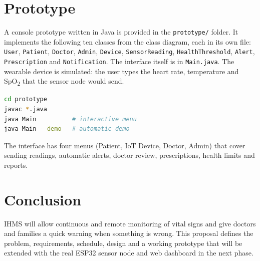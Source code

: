 \documentclass[12pt,a4paper]{article}
\begin{document}

\section{Prototype}
A console prototype written in Java is provided in the \texttt{prototype/} folder. It implements the following ten classes from the class diagram, each in its own file: \texttt{User}, \texttt{Patient}, \texttt{Doctor}, \texttt{Admin}, \texttt{Device}, \texttt{SensorReading}, \texttt{HealthThreshold}, \texttt{Alert}, \texttt{Prescription} and \texttt{Notification}. The interface itself is in \texttt{Main.java}. The wearable device is simulated: the user types the heart rate, temperature and SpO\textsubscript{2} that the sensor node would send.

\begin{lstlisting}[language=bash,basicstyle=\ttfamily\small]
cd prototype
javac *.java
java Main          # interactive menu
java Main --demo   # automatic demo
\end{lstlisting}

The interface has four menus (Patient, IoT Device, Doctor, Admin) that cover sending readings, automatic alerts, doctor review, prescriptions, health limits and reports.

\section{Conclusion}
IHMS will allow continuous and remote monitoring of vital signs and give doctors and families a quick warning when something is wrong. This proposal defines the problem, requirements, schedule, design and a working prototype that will be extended with the real ESP32 sensor node and web dashboard in the next phase.
\end{document}

